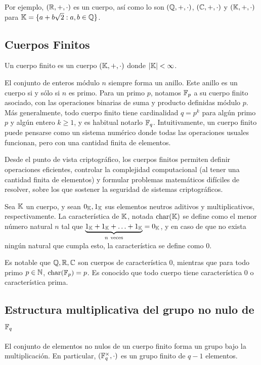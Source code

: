 Por ejemplo, $(\mathbb{R}, +, \cdot)$ es un cuerpo, así como lo son $(\mathbb{Q}, +, \cdot)$, $(\mathbb{C}, +, \cdot)$ y $(\mathbb{K}, +, \cdot)$ para $\mathbb{K}  = \{a + b\sqrt{2}: a, b \in \mathbb{Q}\}$.

\subsection{Cuerpos Finitos}
\label{subsec:apendice-a-cuerpos-finitos-cuerpos-finitos}

\begin{definition}
\label{def:apendice-a-cuerpos-finitos-cuerpo-finito}
	Un cuerpo finito es un cuerpo $(\mathbb{K}, +, \cdot)$ donde $|\mathbb{K}| < \infty$.
\end{definition}

El conjunto de enteros módulo $n$ siempre forma un anillo. Este anillo es un cuerpo si y sólo si $n$ es primo. Para un primo $p$, notamos $\mathbb{F}_p$ a su cuerpo finito asociado, con las operaciones binarias de suma y producto definidas módulo $p$. Más generalmente, todo cuerpo finito tiene cardinalidad $q = p^k$ para algún primo $p$ y algún entero $k \geq 1$, y es habitual notarlo $\mathbb{F}_q$. Intuitivamente, un cuerpo finito puede pensarse como un sistema numérico donde todas las operaciones usuales funcionan, pero con una cantidad finita de elementos.

Desde el punto de vista criptográfico, los cuerpos finitos permiten definir operaciones eficientes, controlar la complejidad computacional (al tener una cantidad finita de elementos) y formular problemas matemáticos difíciles de resolver, sobre los que sostener la seguridad de sistemas criptográficos.

\begin{definition}[Característica]
\label{def:apendice-a-cuerpos-finitos-caracteristica}
	Sea $\mathbb{K}$ un cuerpo, y sean $0_{\mathbb{K}}, 1_{\mathbb{K}}$ sus elementos neutros aditivos y multiplicativos, respectivamente. La característica de $\mathbb{K}$, notada $\mathrm{char}(\mathbb{K})$ se define como el menor número natural $n$ tal que $\underbrace{1_{\mathbb{K}} + 1_{\mathbb{K}} + \ldots + 1_{\mathbb{K}}}_{n\ \text{veces}} = 0_{\mathbb{K}}$, y en caso de que no exista ningún natural que cumpla esto, la característica se define como $0$.
\end{definition}

Es notable que $\mathbb{Q}, \mathbb{R}, \mathbb{C}$ son cuerpos de característica $0$, mientras que para todo primo $p \in \mathbb{N}$, $\mathrm{char}(\mathbb{F}_p) = p$. Es conocido que todo cuerpo tiene característica $0$ o característica prima.

\subsection{Estructura multiplicativa del grupo no nulo de \texorpdfstring{$\mathbb{F}_q$}{Fq}}
\label{subsec:apendice-a-cuerpos-finitos-estructura-multiplicativa-del-grupo-no-nulo-de-fq}
El conjunto de elementos no nulos de un cuerpo finito forma un grupo bajo la multiplicación. En particular, $(\mathbb{F}_{q}^{\times}, \cdot)$ es un grupo finito de $q - 1$ elementos.

